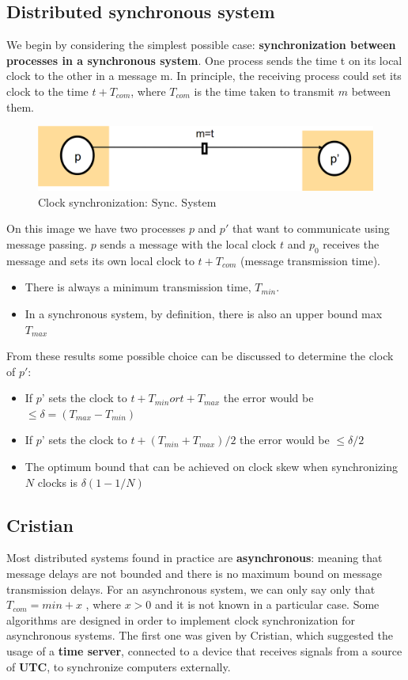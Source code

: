\subsection{Distributed synchronous system}
We begin by considering the simplest possible case: \textbf{synchronization between processes in a synchronous system}. 
One process sends the time t on its local clock to the other in a message m. In principle, the receiving process could set its clock to the time \(t+T_{com}\), where \(T_{com}\) is the time taken to transmit \(m\) between them.

\begin{figure}[!h]
    \centering
    \includegraphics[width=.70\linewidth]{images/Clock/clockSyncInSyncSystem.png}
    \caption{Clock synchronization: Sync. System}
\end{figure}

On this image we have two processes \(p\) and \(p'\) that want to communicate using message passing. \(p\) sends a message with the local clock \(t\) and \(p_0\) receives the message and sets its own local clock to \(t + T_{com}\) (message transmission time).

\begin{itemize}
    \item There is always a minimum transmission time, \(T_{min}\).
    \item In a synchronous system, by definition, there is also an upper bound max \(T_{max}\)
\end{itemize}
From these results some possible choice can be discussed to determine the clock of \(p'\):
\begin{itemize}
    \item If \(p’\) sets the clock to \(t + T_{min} or t + T_{max}\) the error would be \(\leq \delta = (T_{max} - T_{min})\)
    \item If \(p’\) sets the clock to \(t + (T_{min} + T_{max})/2\) the error would be \(\leq \delta/2\)
    \item The optimum bound that can be achieved on clock skew when synchronizing \(N\) clocks is \(\delta(1 - 1/N)\)
\end{itemize}

\subsection{Cristian}
Most distributed systems found in practice are \textbf{asynchronous}: meaning that message delays are not bounded and there is no maximum bound on message transmission delays. For an asynchronous system, we can only say only that \(T_{com} = min + x\) , where \(x > 0\) and it is not known in a particular case. Some algorithms are designed in order to implement clock synchronization for asynchronous systems. The first one was given by Cristian, which suggested the usage of a \textbf{time server}, connected to a device that receives signals from a source of \textbf{UTC}, to synchronize computers externally.

